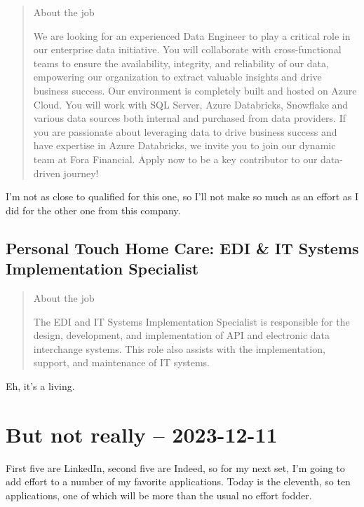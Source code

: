 \documentclass[
	letterpaper, %
	12pt, %
]{CSSullivanBusinessReport}
\begin{document}
\begin{quote}
	About the job
	
	We are looking for an experienced Data Engineer to play a critical role in our enterprise data initiative. You will collaborate with cross-functional teams to ensure the availability, integrity, and reliability of our data, empowering our organization to extract valuable insights and drive business success.
	Our environment is completely built and hosted on Azure Cloud. You will work with SQL Server, Azure Databricks, Snowflake and various data sources both internal and purchased from data providers.
	If you are passionate about leveraging data to drive business success and have expertise in Azure Databricks, we invite you to join our dynamic team at Fora Financial. Apply now to be a key contributor to our data-driven journey!

\end{quote}

I'm not as close to qualified for this one, so I'll not make so much as an effort as I did for the other one from this company. 


\subsection[Personal Touch Home Care]{Personal Touch Home Care: EDI \& IT Systems Implementation Specialist}

\begin{quote}
	About the job
	
	The EDI and IT Systems Implementation Specialist is responsible for the design, development, and implementation of API and electronic data interchange systems. This role also assists with the implementation, support, and maintenance of IT systems.

\end{quote}

Eh, it's a living.


\section[11 Dec: Boost]{But not really -- 2023-12-11} %

First five are LinkedIn, second five are Indeed, so for my next set, I'm going to add effort to a number of my favorite applications. Today is the eleventh, so ten applications, one of which will be more than the usual no effort fodder. 
\end{document}
